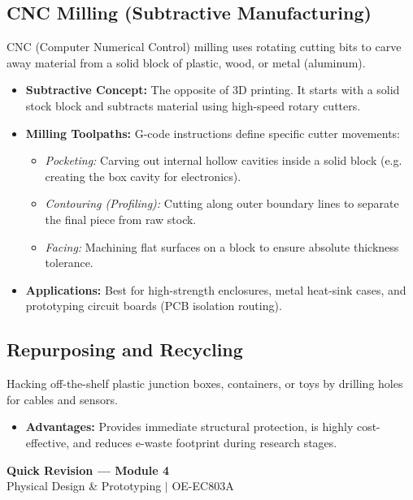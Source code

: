\documentclass[12pt,a4paper]{article}
\begin{document}
\subsection{CNC Milling (Subtractive Manufacturing)}
CNC (Computer Numerical Control) milling uses rotating cutting bits to carve away material from a solid block of plastic, wood, or metal (aluminum).
\begin{itemize}[leftmargin=*, itemsep=3pt]
  \item \textbf{Subtractive Concept:} The opposite of 3D printing. It starts with a solid stock block and subtracts material using high-speed rotary cutters.
  \item \textbf{Milling Toolpaths:} G-code instructions define specific cutter movements:
        \begin{itemize}[leftmargin=*, label=$\circ$, itemsep=1.0pt]
          \item \textit{Pocketing:} Carving out internal hollow cavities inside a solid block (e.g. creating the box cavity for electronics).
          \item \textit{Contouring (Profiling):} Cutting along outer boundary lines to separate the final piece from raw stock.
          \item \textit{Facing:} Machining flat surfaces on a block to ensure absolute thickness tolerance.
        \end{itemize}
  \item \textbf{Applications:} Best for high-strength enclosures, metal heat-sink cases, and prototyping circuit boards (PCB isolation routing).
\end{itemize}

\subsection{Repurposing and Recycling}
Hacking off-the-shelf plastic junction boxes, containers, or toys by drilling holes for cables and sensors.
\begin{itemize}[leftmargin=*, itemsep=2.5pt]
  \item \textbf{Advantages:} Provides immediate structural protection, is highly cost-effective, and reduces e-waste footprint during research stages.
\end{itemize}

\newpage

\begin{center}
  {\large\bfseries\color{myred} Quick Revision — Module 4}\\[3pt]
  {\small\color{mydark} Physical Design \& Prototyping $|$ OE-EC803A}
\end{center}
\noindent{\color{myred}\rule{\linewidth}{1.2pt}}
\vspace{8pt}
\end{document}
